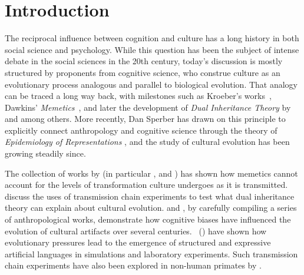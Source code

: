 
\section{Introduction} %

\begin{new}

The reciprocal influence between cognition and culture has a long history in both social science and psychology.
While this question has been the subject of intense debate in the social sciences in the 20th century, today's discussion is mostly structured by proponents from cognitive science, who construe culture as an evolutionary process analogous and parallel to biological evolution.
That analogy can be traced a long way back, with milestones such as Kroeber's works~\citeyearpar{kroeber_nature_1952}, Dawkins' \emph{Memetics}~\citeyearpar{dawkins_selfish_1976}, and later the development of \emph{Dual Inheritance Theory} by \citet{boyd_culture_1985} and \citet{cavalli-sforza_cultural_1981} among others.
More recently, Dan Sperber has drawn on this principle to explicitly connect anthropology and cognitive science through the theory of \emph{Epidemiology of Representations} \citep{sperber_explaining_1996}, and the study of cultural evolution has been growing steadily since.

The collection of works by \citet{aunger_darwinizing_2000} (in particular \citealp{bloch_well-disposed_2000}, and \citealp{kuper_if_2000}) has shown how memetics cannot account for the levels of transformation culture undergoes as it is transmitted.
 discuss the uses of transmission chain experiments to test what dual inheritance theory can explain about cultural evolution.
 and \citet{miton_universal_2015}, by carefully compiling a series of anthropological works, demonstrate how cognitive biases have influenced the evolution of cultural artifacts over several centuries.
\citeauthor{kirby_cumulative_2008}~(\citeyear{kirby_cumulative_2008,cornish_systems_2013}) have shown how evolutionary pressures lead to the emergence of structured and expressive artificial languages in simulations and laboratory experiments.
Such transmission chain experiments have also been explored in non-human primates by \citet{claidiere_cultural_2014}.


\end{new}
